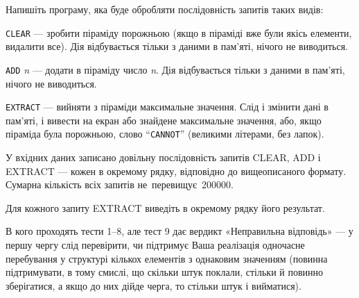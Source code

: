 ﻿Напишіть програму, яка буде обробляти послідовність запитів таких видів:

{\tt CLEAR} --- зробити піраміду порожньою (якщо в піраміді вже були якісь елементи, видалити все). Дія відбувається тільки з даними в пам'яті, нічого не виводиться.

{\tt ADD} {\it n} --- додати в піраміду число {\it n}. Дія відбувається тільки з даними в пам'яті, нічого не виводиться.

{\tt EXTRACT} --- вийняти з піраміди максимальне значення. Слід і змінити дані в пам'яті, і вивести на екран або знайдене максимальне значення, або, якщо піраміда була порожньою, слово ``{\tt CANNOT}'' (великими літерами, без лапок).

\InputFile
У вхідних даних записано довільну послідовність запитів CLEAR, ADD і EXTRACT --- кожен в окремому рядку, відповідно до вищеописаного формату.
Сумарна кількість всіх запитів не~перевищує~200000.

\OutputFile
Для кожного запиту EXTRACT виведіть в окремому рядку його результат.

\Examples

\begin{example}
\end{example}

\Note
В кого проходять тести 1–8, але тест 9 дає вердикт «Неправильна відповідь» --- у першу чергу слід перевірити, чи підтримує Ваша реалізація одночасне перебування у структурі кількох елементів з однаковим значенням (повинна підтримувати, в тому смислі, що скільки штук поклали, стільки й повинно зберігатися, а якщо до них дійде черга, то стільки штук і вийматися). 